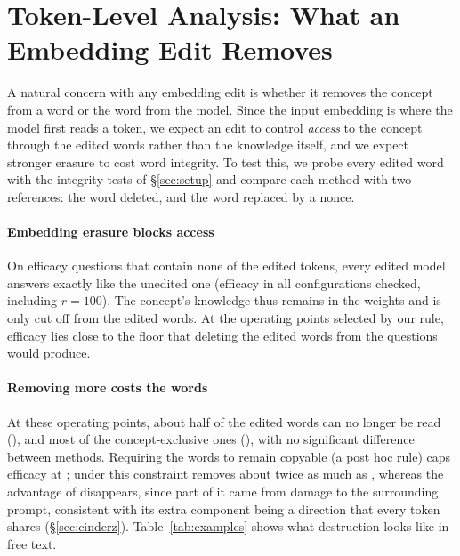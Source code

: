 \section{Token-Level Analysis: What an Embedding Edit Removes}
\label{sec:token}

A natural concern with any embedding edit is whether it removes the concept from a word or the word from the model.
Since the input embedding is where the model first reads a token, we expect an edit to control \emph{access} to the concept through the edited words rather than the knowledge itself, and we expect stronger erasure to cost word integrity.
To test this, we probe every edited word with the integrity tests of \S\ref{sec:setup} and compare each method with two references: the word deleted, and the word replaced by a nonce.

\paragraph{Embedding erasure blocks access}
On efficacy questions that contain none of the edited tokens, every edited model answers exactly like the unedited one (efficacy  in all  configurations checked, including $r = 100$).
The concept's knowledge thus remains in the weights and is only cut off from the edited words.
At the operating points selected by our rule, efficacy lies close to the floor that deleting the edited words from the questions would produce.

\paragraph{Removing more costs the words}
At these operating points, about half of the edited words can no longer be read (), and most of the concept-exclusive ones (), with no significant difference between methods.
Requiring the words to remain copyable (a post hoc rule) caps efficacy at ; under this constraint \cinder{} removes about twice as much as \ember{}, whereas the advantage of \cinderz{} disappears, since part of it came from damage to the surrounding prompt, consistent with its extra component being a direction that every token shares (\S\ref{sec:cinderz}).
Table~\ref{tab:examples} shows what destruction looks like in free text.

